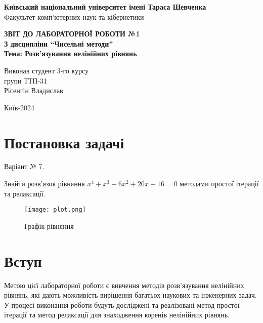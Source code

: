 \documentclass[a4paper, 12pt]{article}
\begin{document}
\begin{titlepage}
	\begin{center}
		\Large
		\textbf{Київський національний університет імені Тараса Шевченка} \\
		Факультет комп'ютерних наук та кібернетики \\

		\vspace{6cm}

		\textbf{\LARGE ЗВІТ ДО ЛАБОРАТОРНОЇ РОБОТИ №1} \\[0.5cm]
		\textbf{З дисципліни ``Чисельні методи''} \\[0.5cm]
		\textbf{Тема: Розв'язування нелінійних рівнянь} \\

		\vfill

		\hspace{7cm} Виконав студент 3-го курсу \\
		\hspace{7cm} групи ТТП-31 \\
		\hspace{7cm} Рісенгін Владислав \\
		\vspace{2cm}

		Київ-2024
	\end{center}
\end{titlepage}

\newpage


\section{Постановка задачі}

Варіант № 7.

Знайти розв'язок рівняння $x^4 + x^3 - 6x^2 + 20x - 16 = 0$ методами простої ітерації та релаксації.

\begin{figure}[h]
	\centering
	\texttt{[image: plot.png]}
	\caption{Графік рівняння}
\end{figure}
\newpage

\section{Вступ}

Метою цієї лабораторної роботи є вивчення методів розв'язування нелінійних рівнянь, які дають можливість вирішення багатьох наукових та інженерних задач. У процесі виконання роботи будуть досліджені та реалізовані метод простої ітерації та метод релаксації для знаходження коренів нелінійних рівнянь.
\end{document}
